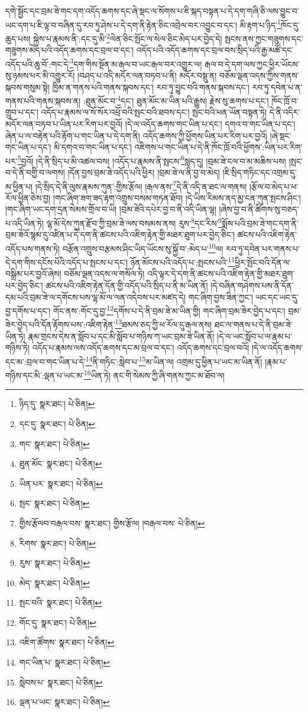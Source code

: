 དགེ་སྦྱོང་དང་བྲམ་ཟེ་གང་དག་འདོད་ཆགས་དང་ཞེ་སྡང་ལ་སོགས་པ་ཇི་སྐད་བསྟན་པ་དེ་དག་གཞི་ཅི་ལས་བྱུང་བ་ཡང་དག་པ་ཇི་ལྟ་བ་བཞིན་དུ་རབ་ཏུ་ཤེས་པ་དེ་དག་ནི་རྟེན་ཅིང་འབྲེལ་བར་འབྱུང་བ་དང་། མི་རྟག་པ་ཉིད་\footnote{ཉིད་དུ་  སྣར་ཐང་།  པེ་ཅིན། }ཁོང་དུ་ཆུད་པས། སྐྱེས་པ་རྣམས་ནི་:དང་དུ་མི་\footnote{དང་དུ་  སྣར་ཐང་།  པེ་ཅིན། }ལེན་ཅིང་སྤོང་ལ་སེལ་ཅིང་མེད་པར་བྱེད་དེ། སྤངས་ནས་ཀྱང་གཟུགས་དང་གཟུགས་མེད་པའི་འདོད་ཆགས་དང་བྲལ་བ་དང་། འདོད་པའི་འདོད་ཆགས་དང་བྲལ་བས་སྲིད་པའི་རྒྱ་མཚོ་དང་འདོད་པའི་ཆུ་བོ་:གང་དེ་\footnote{གང་  སྣར་ཐང་།  པེ་ཅིན། }དག་གིས་སྔོན་མ་རྒལ་བ་ཡང་རྒལ་བར་འགྱུར་ལ། རྒལ་བ་དེ་དག་ལས་ཀྱང་ཕྱིར་ཡོངས་སུ་ཉམས་པར་མི་འགྱུར་རོ། །བཤད་པ་འདི་མདོར་ལན་བཏབ་པ་ནི། མདོར་བསྡུ་ན། བཅོམ་ལྡན་འདས་ཀྱིས་གནས་སྐབས་གསུམ་སྟེ། ཁྱིམ་ན་གནས་པའི་གནས་སྐབས་དང་། རབ་ཏུ་བྱུང་བའི་གནས་སྐབས་དང་། རབ་ཏུ་དབེན་པ་ན་གནས་པའི་གནས་སྐབས་ན། :ཐུན་མོང་བ་\footnote{ཐུན་མོང་  སྣར་ཐང་།  པེ་ཅིན། }དང་། ཐུན་མོང་མ་ཡིན་པའི་རྒྱུས། རྗེས་སུ་ཆགས་པ་དང་། ཁོང་ཁྲོ་བ་གྲུབ་པ་དང་། འདོད་པ་རྣམས་ལ་སོ་སོར་འཕྲོ་བའི་སྤང་བའི་ཐབས་དང་། སྤང་བའི་ཕན་ཡོན་བསྟན་ཏེ། དེ་ནི་འདིར་མདོར་ལན་བཏབ་པ་ཡིན་པར་རིག་པར་བྱའོ། །དེ་ལ་འདོད་ཆགས་གང་ཡིན་པ་དང་། དགའ་བ་གང་ཡིན་པ་དང་། ཞེན་པ་ལ་བརྟེན་པའི་རྟོག་པ་གང་ཡིན་པ་དེ་དག་ནི། འདོད་ཆགས་ཀྱི་ཕྱོགས་ཡིན་པར་རིག་པར་བྱའོ། །ཞེ་སྡང་གང་ཡིན་པ་དང་། མི་དགའ་བ་གང་ཡིན་པ་དང་། འཇིགས་པ་གང་ཡིན་པ་དེ་ནི་ཁོང་ཁྲོ་བའི་ཕྱོགས་:ཡིན་པར་རིག་པར་\footnote{ཡིན་པར་  སྣར་ཐང་།  པེ་ཅིན། }བྱའོ། །དེ་ནི་སྲིད་པ་མི་འཚལ་བས། །འདོད་པ་རྣམས་ནི་སྤངས་\footnote{སྤང་  སྣར་ཐང་།  པེ་ཅིན། }སླད་དུ། །བྲམ་ཟེ་ངལ་བ་མ་མཆིས་པས། །སྤང་བ་དེ་ནི་བགྱི་བ་ལགས། །དོན་བྱས་བྲམ་ཟེ་འདོད་པའི་ཕྱིར། །བྲམ་ཟེ་ལ་ནི་བྱ་བ་མེད། །ཇི་སྲིད་གཏིང་དང་འགྲམ་དུ་མ་ཕྱིན་པ། །དེ་སྲིད་དེ་ནི་ལུས་རྣམས་ཀུན་:གྱིས་རྩོལ། །རྒལ་ནས་\footnote{གྱིས་རྩོལབ་བརྒལ་བས་  སྣར་ཐང་། གྱིས་རྩོལ། །བརྒལ་བས་  པེ་ཅིན། }དེ་ནི་འདི་ན་ཐང་ལ་གནས། །རྩོལ་བ་མེད་པ་ཕ་རོལ་ཕྱིན་ཅེས་བྱ། །གང་ཞིག་ཟག་ཟད་རྟག་འགྲུས་བསམ་གཏན་ཐོབ། །དེ་ཡིས་རིམས་ནད་མྱ་ངན་ཀུན་སྤངས་ཤིང་། །གང་ཞིག་ཡང་དག་དྲན་སེམས་གྲོལ་བ་ཡི། །བྲམ་ཟེའི་དཔེར་བྱ་བ་ནི་འདི་ཡིན་ལྷ། །ཞེས་བྱ་བ་ནི་ཚིགས་སུ་བཅད་པ་འདི་ཡིན་ཏེ། ལྷ་མོ་དེས་ཀུན་རྫོབ་ཀྱི་བྲམ་ཟེ་ལས་བསམས་ནས། རུས་\footnote{རིགས་  སྣར་ཐང་།  པེ་ཅིན། }དང་རིས་\footnote{རུས་  སྣར་ཐང་།  པེ་ཅིན། }སྨོས་པའི་བྲམ་ཟེ་གང་དག་ནི་བྲམ་ཟེའོ་སྙམ་དུ་འཛིན་པ་དེ་དག་ནི་ཚངས་པའི་འཇིག་རྟེན་གྱི་མཐར་ཐུག་པར་བྱེད་ཅིང་། ཚངས་པའི་འཇིག་རྟེན་འདོད་པས་གནས་ཏེ། བརྩོན་འགྲུས་བརྩམས་ཤིང་ཡིད་ཡོངས་སུ་སྐྱོ་བ་:མེད་པ་\footnote{མེད་  སྣར་ཐང་།  པེ་ཅིན། }ལ། རབ་ཏུ་དབེན་པར་གནས་པ་དེ་དག་གིས་དངོས་པོའི་འདོད་པ་སྤངས་པ་དང་། ཉོན་མོངས་པའི་འདོད་པ་:སྤངས་པའི་\footnote{སྤང་བའི་  སྣར་ཐང་།  པེ་ཅིན། }ཕྱིར་སྤོང་བའི་དོན་ལ་བསྒྲིམ་པར་བྱའོ་ཞེས། བཅོམ་ལྡན་འདས་ལ་གསོལ་ཏེ། འདི་ལྟར་དེ་དག་ནི་ཚངས་པའི་འཇིག་རྟེན་གྱི་མཐར་ཐུག་པར་བྱེད་ཅིང་། ཚངས་པའི་འཇིག་རྟེན་དོན་གྱི་འདོད་པའི་སྲིད་པ་ནི་མ་ཡིན་ནོ། །དེ་བཞིན་གཤེགས་པས་ནི་དོན་དམ་པའི་བྲམ་ཟེ་ལ་དགོངས་པས་ལྷ་མོ་ལ་ལན་འདེབས་པར་མཛད་དེ། གང་ཞིག་བྱས་ཟིན་ཀྱང་། ཡང་དང་ཡང་དུ་བྱ་དགོས་པ་དང་། གོང་ནས་:གོང་དུ་བྱ་\footnote{གོང་དུ་  སྣར་ཐང་།  པེ་ཅིན། }དགོས་པ་དེ་ནི་བྲམ་ཟེ་མ་ཡིན་གྱི། གང་ཞིག་བྲམ་ཟེར་བྱེད་པ་དང་། བྲམ་ཟེར་བྱེད་པའི་དོན་རྟོགས་པས་:འཇིག་རྟེན་\footnote{འཇིག་ཚོགས་  སྣར་ཐང་།  པེ་ཅིན། }ཐམས་ཅད་ཀྱི་ཕ་རོལ་དུ་རྒལ་ནས། ཐང་ལ་གནས་པ་དེ་ནི་བྲམ་ཟེ་ཡིན་ཏེ། རྣམ་གྲངས་དེས་ན་སློབ་པ་དང་མི་སློབ་པ་གཉིས་ཀ་ཡང་བྲམ་ཟེ་ཡིན་ནོ། །དེ་ལ་ཡང་སློབ་པ་ལ་རྣམ་པ་གཉིས་ཏེ། འདོད་པ་རྣམས་ལས་འདོད་ཆགས་དང་མ་བྲལ་བ་དང་། འདོད་ཆགས་དང་བྲལ་བའོ། །དེ་ལ་འདོད་ཆགས་དང་མ་:བྲལ་བ་གང་ཡིན་པ་དེ་\footnote{གང་ཡིན་པ་  སྣར་ཐང་།  པེ་ཅིན། }ནི་གཏིང་:སླེབ་པ་\footnote{སླེབས་པ་  སྣར་ཐང་།  པེ་ཅིན། }མ་ཡིན་ལ། འགྲམ་དུ་ཕྱིན་པ་ཡང་མ་ཡིན་ནོ། །རྣམ་པ་གཉིས་དང་མི་:ལྡན་པ་ཡང་མ་\footnote{ལྡན་པ་ཡང་  སྣར་ཐང་།  པེ་ཅིན། }ཡིན་ཏེ། ནང་གི་སེམས་ཀྱི་ཞི་གནས་ཀྱང་མ་ཐོབ་ལ། 